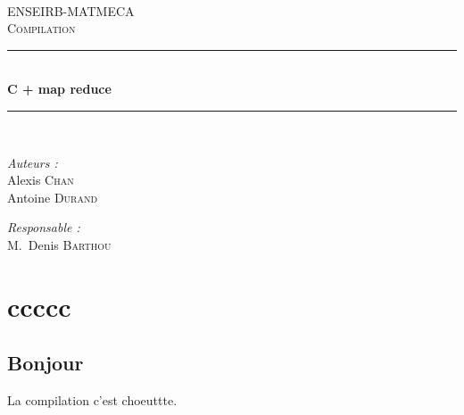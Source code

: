 \documentclass[a4paper,12pt]{article}
\begin{document}
\begin{titlepage}


\begin{center}

~\\[3.0cm]

\textsc{\LARGE ENSEIRB-MATMECA}\\[1.5cm]

\textsc{\Large  Compilation}\\[1.5cm]

\hrule ~\\[0.4cm]
{\huge \bfseries  C + map reduce}\\[0.4cm]
\hrule ~\\[1.5cm]

\begin{minipage}[t]{0.4\textwidth}
  \begin{flushleft} \large
    \emph{Auteurs :}\\
    Alexis \textsc{Chan}\\
    Antoine \textsc{Durand}
  \end{flushleft}
\end{minipage}
\begin{minipage}[t]{0.5\textwidth}
  \begin{flushright} \large
    \emph{Responsable :} \\
    M.~Denis \textsc{Barthou} \\

  \end{flushright}
\end{minipage}

\end{center}

\end{titlepage}

\newpage
\section{ccccc}

\subsection{Bonjour}
La compilation c'est choeuttte. 
\end{document}
